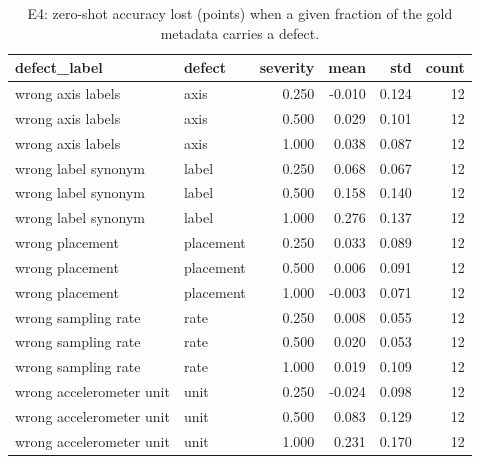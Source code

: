 \begin{table}
\caption{E4: zero-shot accuracy lost (points) when a given fraction of the gold metadata carries a defect.}
\label{tab:T7_defect_costs}
\begin{tabular}{llrrrr}
\toprule
defect\_label & defect & severity & mean & std & count \\
\midrule
wrong axis labels & axis & 0.250 & -0.010 & 0.124 & 12 \\
wrong axis labels & axis & 0.500 & 0.029 & 0.101 & 12 \\
wrong axis labels & axis & 1.000 & 0.038 & 0.087 & 12 \\
wrong label synonym & label & 0.250 & 0.068 & 0.067 & 12 \\
wrong label synonym & label & 0.500 & 0.158 & 0.140 & 12 \\
wrong label synonym & label & 1.000 & 0.276 & 0.137 & 12 \\
wrong placement & placement & 0.250 & 0.033 & 0.089 & 12 \\
wrong placement & placement & 0.500 & 0.006 & 0.091 & 12 \\
wrong placement & placement & 1.000 & -0.003 & 0.071 & 12 \\
wrong sampling rate & rate & 0.250 & 0.008 & 0.055 & 12 \\
wrong sampling rate & rate & 0.500 & 0.020 & 0.053 & 12 \\
wrong sampling rate & rate & 1.000 & 0.019 & 0.109 & 12 \\
wrong accelerometer unit & unit & 0.250 & -0.024 & 0.098 & 12 \\
wrong accelerometer unit & unit & 0.500 & 0.083 & 0.129 & 12 \\
wrong accelerometer unit & unit & 1.000 & 0.231 & 0.170 & 12 \\
\bottomrule
\end{tabular}
\end{table}

